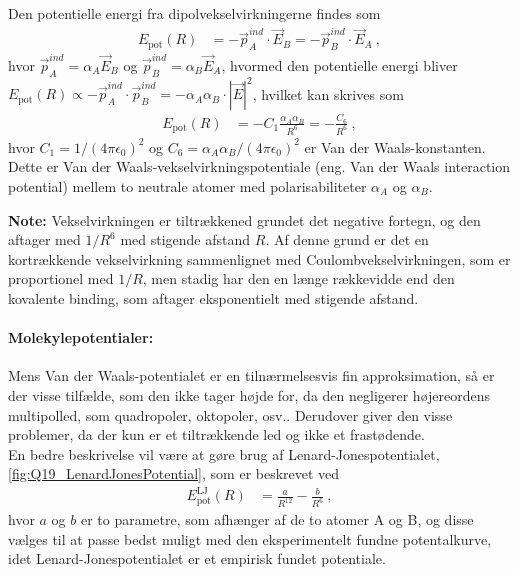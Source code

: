 Den potentielle energi fra dipolvekselvirkningerne findes som
\begin{align}
    E_\text{pot}(R) &= -\Vec{p}_A^{ind} \cdot \Vec{E}_B = -\Vec{p}_B^{ind} \cdot \Vec{E}_A \: ,
\end{align}
hvor $\Vec{p}_A^{ind} = \alpha_A \Vec{E}_B$ og $\Vec{p}_B^{ind} = \alpha_B \Vec{E}_A$, hvormed den potentielle energi bliver $E_\text{pot}(R) \propto - \Vec{p}_A^{ind} \cdot \Vec{p}_B^{ind} = -\alpha_A \alpha_B \cdot |\Vec{E}|^2$, hvilket kan skrives som
\begin{align}
    E_\text{pot}(R) &= -C_1 \frac{\alpha_A \alpha_B}{R^6} = - \frac{C_6}{R^6} \: ,
\end{align}
hvor $C_1 = 1/(4\pi\epsilon_0)^2$ og $C_6 = \alpha_A \alpha_B /(4\pi\epsilon_0)^2$ er \textsf{Van der Waals-konstanten}. Dette er \textsf{Van der Waals-vekselvirkningspotentiale} (eng. Van der Waals interaction potential) mellem to neutrale atomer med polarisabiliteter $\alpha_A$ og $\alpha_B$.

\textbf{Note:} Vekselvirkningen er tiltrækkened grundet det negative fortegn, og den aftager med $1/R^6$ med stigende afstand $R$. Af denne grund er det en kortrækkende vekselvirkning sammenlignet med Coulombvekselvirkningen, som er proportionel med $1/R$, men stadig har den en længe rækkevidde end den kovalente binding, som aftager eksponentielt med stigende afstand.\\


\paragraph{Molekylepotentialer:} Mens Van der Waals-potentialet er en tilnærmelsesvis fin approksimation, så er der visse tilfælde, som den ikke tager højde for, da den negligerer højereordens multipolled, som quadropoler, oktopoler, osv.. Derudover giver den visse problemer, da der kun er et tiltrækkende led og ikke et frastødende.\\

En bedre beskrivelse vil være at gøre brug af \textsf{Lenard-Jonespotentialet}, \cref{fig:Q19_LenardJonesPotential}, som er beskrevet ved
\begin{align}
    E_\text{pot}^\text{LJ}(R) &= \frac{a}{R^12} - \frac{b}{R^6} \: ,
\end{align}
hvor $a$ og $b$ er to parametre, som afhænger af de to atomer A og B, og disse vælges til at passe bedst muligt med den eksperimentelt fundne potentalkurve, idet Lenard-Jonespotentialet er et empirisk fundet potentiale.

